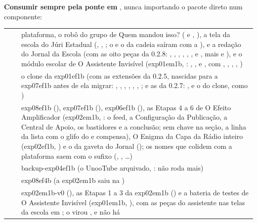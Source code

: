 \begin{regra}
\textbf{Consumir sempre pela ponte em }, nunca importando o
pacote direto num componente:

\begin{tabularx}{\linewidth}{@{}L{28mm}L{22mm}X@{}}
 &  & plataforma, o robô do grupo de Quem mandou isso? ( e , ), a tela da escola do Júri Estadual (, , ; o  e o  da cadeia saíram com a ), e a redação do Jornal da Escola (com as oito peças da 0.2.8: , , , , , ,  e , mais  e ), e o módulo escolar de O Assistente Invisível (exp01em1b, : , ,  e ,  com , , , , )\\
 &  & o clone da exp01ef1b (com as extensões da 0.2.5, nascidas para a exp07ef1b antes de ela migrar: , , , , , , ; e as da 0.2.7: ,  e o  do clone, como )\\
 &  & exp08ef1b (), exp07ef1b (), exp06ef1b (), as Etapas 4 a 6 de O Efeito Amplificador (exp02em1b, : o feed, a Configuração da Publicação, a Central de Apoio, os bastidores e a conclusão; sem chave na seção, a linha da lista com o glifo do  e  compensa), O Enigma da Capa da Rádio inteiro (exp02ef1b, ) e o  da gaveta do Jornal (); os nomes que colidem com a plataforma saem com o sufixo  (, , \ldots)\\
 &  & backup-exp04ef1b (o UnooTube arquivado, : não roda mais)\\
 &  & exp08ef4b (a exp02em1b saiu na )\\
 &  & exp02em1b-v0 (), as Etapas 1 a 3 da exp02em1b () e a bateria de testes de O Assistente Invisível (exp01em1b, ), com as peças do assistente nas telas da escola em ; o  virou , e não há \\

\end{tabularx}
\end{regra}
